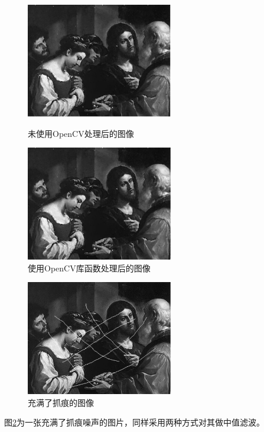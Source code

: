 \documentclass[a4paper]{ctexrep}
\begin{document}
\begin{figure}[h]
\centering
\begin{varwidth}[t]{\textwidth}
\vspace{0pt}
\includegraphics[height=5cm]{img/processedImage1.pdf}
\caption{未使用OpenCV处理后的图像}
\label{fig:firtProc}
\end{varwidth}%
\quad
\begin{varwidth}[t]{\textwidth}
\vspace{0pt}
\centering
\includegraphics[height=5cm]{img/processedImage2.pdf}
\caption{使用OpenCV库函数处理后的图像}
\label{fig:secondProc}
\end{varwidth}
\end{figure}

\begin{figure}[h]
\centering
\includegraphics[height=5cm]{img/scratchNoises.pdf}
\caption{充满了抓痕的图像}
\label{fig:scratchedImg}
\end{figure}

图\ref{fig:scratchedImg}为一张充满了抓痕噪声的图片，同样采用两种方式对其做中值滤波。
\end{document}
